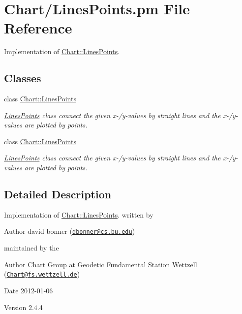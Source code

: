 \hypertarget{LinesPoints_8pm}{
\section{Chart/LinesPoints.pm File Reference}
\label{LinesPoints_8pm}
}


Implementation of \hyperlink{classChart_1_1LinesPoints}{Chart::LinesPoints}.  


\subsection*{Classes}
\begin{DoxyCompactItemize}
\item 
class \hyperlink{classChart_1_1LinesPoints}{Chart::LinesPoints}
\begin{DoxyCompactList}\small\item\em \hyperlink{classChart_1_1LinesPoints}{LinesPoints} class connect the given x-\//y-\/values by straight lines and the x-\//y-\/values are plotted by points. \item\end{DoxyCompactList}\item 
class \hyperlink{classChart_1_1LinesPoints}{Chart::LinesPoints}
\begin{DoxyCompactList}\small\item\em \hyperlink{classChart_1_1LinesPoints}{LinesPoints} class connect the given x-\//y-\/values by straight lines and the x-\//y-\/values are plotted by points. \item\end{DoxyCompactList}\end{DoxyCompactItemize}


\subsection{Detailed Description}
Implementation of \hyperlink{classChart_1_1LinesPoints}{Chart::LinesPoints}. written by \begin{DoxyAuthor}{Author}
david bonner (\href{mailto:dbonner@cs.bu.edu}{\tt dbonner@cs.bu.edu})
\end{DoxyAuthor}
maintained by the \begin{DoxyAuthor}{Author}
Chart Group at Geodetic Fundamental Station Wettzell (\href{mailto:Chart@fs.wettzell.de}{\tt Chart@fs.wettzell.de}) 
\end{DoxyAuthor}
\begin{DoxyDate}{Date}
2012-\/01-\/06 
\end{DoxyDate}
\begin{DoxyVersion}{Version}
2.4.4 
\end{DoxyVersion}

